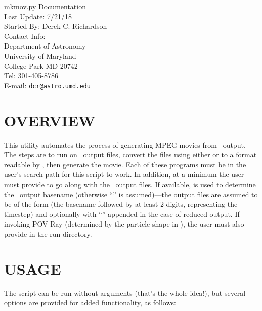 



\begin{flushleft}
  \huge{mkmov.py Documentation}\\
  \bigskip\bigskip
  \Large{Last Update: 7/21/18}\\
  \bigskip\bigskip
  \large{Started By: Derek C. Richardson}\\
  \bigskip
  \large{Contact Info:}\\
  Department of Astronomy\\
  University of Maryland\\
  College Park MD 20742\\
  Tel: 301-405-8786\\
  E-mail: \texttt{dcr@astro.umd.edu}
\end{flushleft}

\tableofcontents

\section{OVERVIEW}

This utility automates the process of generating MPEG movies from
\pkd\ output.  The steps are to run  on \pkd\ output
files, convert the files using either  or 
to a format readable by , then generate the movie.  Each
of these programs must be in the user's search path for this script to
work.  In addition, at a minimum the user must provide
 to go along with the \pkd\ output files.  If
available,  is used to determine the \pkd\ output
basename (otherwise ``'' is assumed)---the output files are
assumed to be of the form  (\ie the
basename followed by at least 2 digits, representing the timestep) and
optionally with ``'' appended in the case of reduced output.
If invoking POV-Ray (determined by the particle shape in
), the user must also provide  in
the run directory.

\section{USAGE}

The script can be run without arguments (that's the whole idea!), but
several options are provided for added functionality, as follows:

